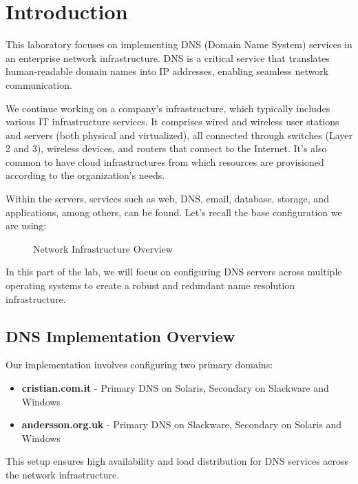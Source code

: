 \documentclass[12pt,a4paper]{article}
\begin{document}
\section{Introduction}\label{introduction}

This laboratory focuses on implementing DNS (Domain Name System) services in an enterprise network infrastructure. DNS is a critical service that translates human-readable domain names into IP addresses, enabling seamless network communication.

We continue working on a company's infrastructure, which typically includes various IT infrastructure services. It comprises wired and wireless user stations and servers (both physical and virtualized), all connected through switches (Layer 2 and 3), wireless devices, and routers that connect to the Internet. It's also common to have cloud infrastructures from which resources are provisioned according to the organization's needs.

Within the servers, services such as web, DNS, email, database, storage, and applications, among others, can be found. Let's recall the base configuration we are using:

\begin{figure}[h]
    \centering
    \caption{Network Infrastructure Overview}
    \label{fig:network_overview}
\end{figure}

In this part of the lab, we will focus on configuring DNS servers across multiple operating systems to create a robust and redundant name resolution infrastructure.

\subsection{DNS Implementation Overview}
Our implementation involves configuring two primary domains:
\begin{itemize}
    \item \textbf{cristian.com.it} - Primary DNS on Solaris, Secondary on Slackware and Windows
    \item \textbf{andersson.org.uk} - Primary DNS on Slackware, Secondary on Solaris and Windows
\end{itemize}

This setup ensures high availability and load distribution for DNS services across the network infrastructure.
\end{document}

